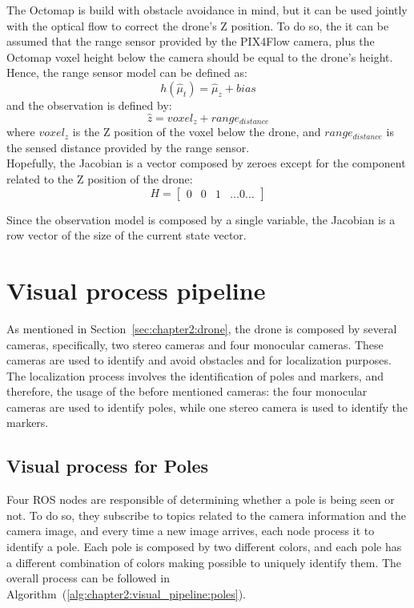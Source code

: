 The Octomap is build with obstacle avoidance in mind, but it can be used jointly with the optical flow to correct the drone's Z position. To do so, the it can be assumed that the range sensor provided by the PIX4Flow camera, plus the Octomap voxel height below the camera should be equal to the drone's height. Hence, the range sensor model can be defined as:
\begin{equation}
    h\left(\hat\mu_t\right) = \hat\mu_z + bias
\end{equation}
and the observation is defined by:
\begin{equation}
    \hat{z} = voxel_z + range_{distance}
\end{equation}
where $voxel_z$ is the Z position of the voxel below the drone, and $range_{distance}$ is the sensed distance provided by the range sensor.\\

Hopefully, the Jacobian is a vector composed by zeroes except for the component related to the Z position of the drone:
\begin{equation}
    H = \begin{bmatrix}
        0 & 0 & 1 & \dots0\dots
    \end{bmatrix}
\end{equation}

Since the observation model is composed by a single variable, the Jacobian is a row vector of the size of the current state vector.


\section{Visual process pipeline}
\label{sec:chapter2:visual}
As mentioned in Section~\ref{sec:chapter2:drone}, the drone is composed by several cameras, specifically, two stereo cameras and four monocular cameras. These cameras are used to identify and avoid obstacles and for localization purposes. The localization process involves the identification of poles and markers, and therefore, the usage of the before mentioned cameras: the four monocular cameras are used to identify poles, while one stereo camera is used to identify the markers.
\subsection{Visual process for Poles}
Four ROS nodes are responsible of determining whether a pole is being seen or not. To do so, they subscribe to topics related to the camera information and the camera image, and every time a new image arrives, each node process it to identify a pole. Each pole is composed by two different colors, and each pole has a different combination of colors making possible to uniquely identify them. The overall process can be followed in Algorithm~(\ref{alg:chapter2:visual_pipeline:poles}).

